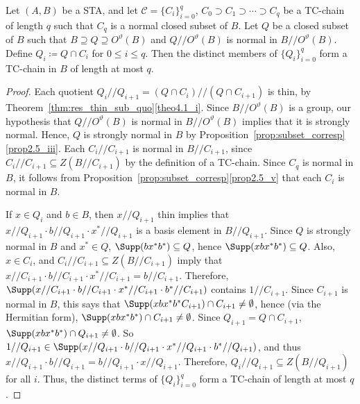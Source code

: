 \begin{lemm}
\label{lem:to_lower}
Let $(A, B)$ be a STA, and let $\mathcal{C} =
\{C_i\}_{i=0}^q$, $C_0 \supset C_1 \supset \cdots \supset C_q$ 
be a TC-chain of length $q$ such that $C_q$ is a normal closed subset of
$B$. 
 Let $Q$ be a closed subset of $B$ such that $B \supseteq Q \supseteq
O^{\vartheta}(B)$ and $Q//O^{\vartheta}(B)$ is normal in
$B//O^{\vartheta}(B)$. Define $Q_i \coloneqq Q\cap C_i$ for $0 \leq i \leq q$. 
Then the distinct members of $\{Q_i\}_{i=0}^q$ form a TC-chain in $B$ of length
at most $q$.
\end{lemm}

\begin{proof}
Each quotient $Q_i//Q_{i+1} = (Q\cap C_i)//(Q\cap C_{i+1})$
is thin, by Theorem~\ref{thm:res_thin_sub_quo}\ref{theo4.1_i}. Since
$B//O^{\vartheta}(B)$ is a group, our hypothesis that
$Q//O^{\vartheta}(B)$ is normal in $B//O^{\vartheta}(B)$ implies that it
is strongly normal. Hence, $Q$ is strongly normal in $B$ by Proposition~\ref{prop:subset_corresp}\ref{prop2.5_iii}. Each $C_i//C_{i+1}$ is normal in
$B//C_{i+1}$, since $C_i//C_{i+1} \subseteq Z(B//C_{i+1})$ by the
definition of a TC-chain. Since $C_q$ is normal in $B$, it follows from
Proposition~\ref{prop:subset_corresp}\ref{prop2.5_v} that each $C_i$ is normal in $B$.
 
 If $x \in Q_i$ and
$b \in B$, then $x//Q_{i+1}$ thin implies that $x//Q_{i+1}\cdot
b//Q_{i+1}\cdot x^*//Q_{i+1}$ is a basis element in $B//Q_{i+1}$. Since
$Q$ is strongly normal in $B$ and $x^* \in Q$, $\Supp (bx^*b^*)
\subseteq Q$, hence $\Supp (xbx^*b^*) \subseteq Q$. Also, $x
\in C_i$, and $C_i//C_{i+1} \subseteq Z(B//C_{i+1})$
imply that $x//C_{i+1}\cdot b//C_{i+1}\cdot x^*//C_{i+1} =
b//C_{i+1}$. Therefore, $\Supp (x//C_{i+1}\cdot
b//C_{i+1}\cdot x^*//C_{i+1}\cdot b^*//C_{i+1})$ contains
$1//C_{i+1}$. Since $C_{i+1}$ is normal in $B$, this says that
$\Supp (xbx^*b^*C_{i+1})\cap C_{i+1} \neq \emptyset$, hence (via the
Hermitian form), $\Supp (xbx^*b^*)\cap C_{i+1} \neq \emptyset$. Since
$Q_{i+1} = Q\cap C_{i+1}$, $\Supp (xbx^*b^*)\cap Q_{i+1} \neq
\emptyset$. So $1//Q_{i+1} \in \Supp (x//Q_{i+1}\cdot
b//Q_{i+1}\cdot x^*//Q_{i+1}\cdot b^*//Q_{i+1})$, and thus
$x//Q_{i+1}\cdot b//Q_{i+1} = b//Q_{i+1}\cdot x//Q_{i+1}$. Therefore,
$Q_i//Q_{i+1} \subseteq Z(B//Q_{i+1})$ for all $i$. 
Thus, the distinct terms of $\{Q_i\}_{i=0}^q$ form a
TC-chain of length at most $q$. 
\end{proof} 


